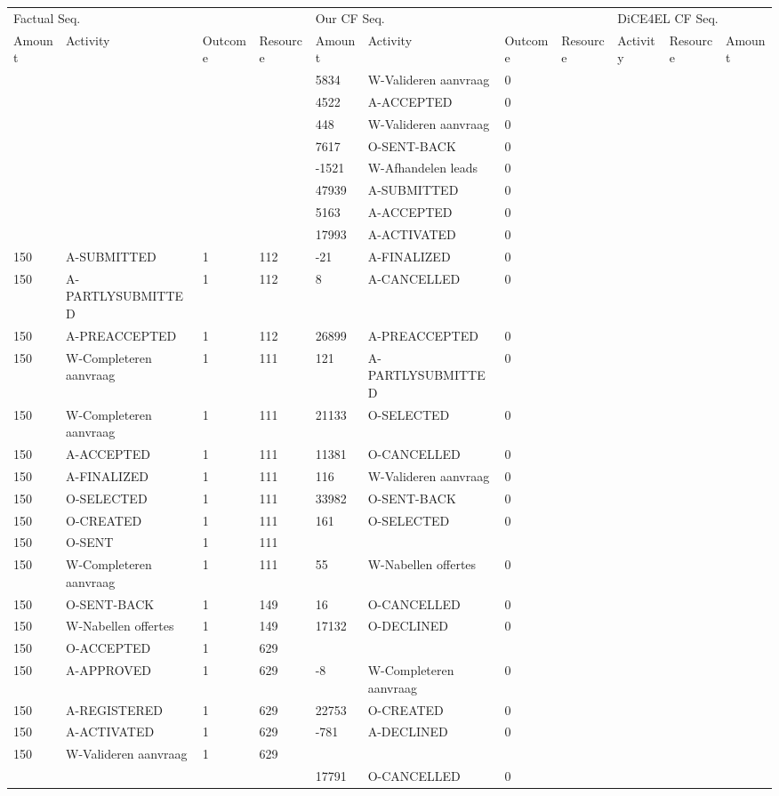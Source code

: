 \begin{tabular}{lllllllllll}
\toprule
\multicolumn{4}{l}{Factual Seq.} & \multicolumn{4}{l}{Our CF Seq.} & \multicolumn{3}{l}{DiCE4EL CF Seq.} \\
Amount & Activity & Outcome & Resource & Amount & Activity & Outcome & Resource & Activity & Resource & Amount \\
\midrule
 &  &  &  & 5834 & W-Valideren aanvraag & 0 &  &  &  &  \\
 &  &  &  & 4522 & A-ACCEPTED & 0 &  &  &  &  \\
 &  &  &  & 448 & W-Valideren aanvraag & 0 &  &  &  &  \\
 &  &  &  & 7617 & O-SENT-BACK & 0 &  &  &  &  \\
 &  &  &  & -1521 & W-Afhandelen leads & 0 &  &  &  &  \\
 &  &  &  & 47939 & A-SUBMITTED & 0 &  &  &  &  \\
 &  &  &  & 5163 & A-ACCEPTED & 0 &  &  &  &  \\
 &  &  &  & 17993 & A-ACTIVATED & 0 &  &  &  &  \\
150 & A-SUBMITTED & 1 & 112 & -21 & A-FINALIZED & 0 &  &  &  &  \\
150 & A-PARTLYSUBMITTED & 1 & 112 & 8 & A-CANCELLED & 0 &  &  &  &  \\
150 & A-PREACCEPTED & 1 & 112 & 26899 & A-PREACCEPTED & 0 &  &  &  &  \\
150 & W-Completeren aanvraag & 1 & 111 & 121 & A-PARTLYSUBMITTED & 0 &  &  &  &  \\
150 & W-Completeren aanvraag & 1 & 111 & 21133 & O-SELECTED & 0 &  &  &  &  \\
150 & A-ACCEPTED & 1 & 111 & 11381 & O-CANCELLED & 0 &  &  &  &  \\
150 & A-FINALIZED & 1 & 111 & 116 & W-Valideren aanvraag & 0 &  &  &  &  \\
150 & O-SELECTED & 1 & 111 & 33982 & O-SENT-BACK & 0 &  &  &  &  \\
150 & O-CREATED & 1 & 111 & 161 & O-SELECTED & 0 &  &  &  &  \\
150 & O-SENT & 1 & 111 &  &  &  &  &  &  &  \\
150 & W-Completeren aanvraag & 1 & 111 & 55 & W-Nabellen offertes & 0 &  &  &  &  \\
150 & O-SENT-BACK & 1 & 149 & 16 & O-CANCELLED & 0 &  &  &  &  \\
150 & W-Nabellen offertes & 1 & 149 & 17132 & O-DECLINED & 0 &  &  &  &  \\
150 & O-ACCEPTED & 1 & 629 &  &  &  &  &  &  &  \\
150 & A-APPROVED & 1 & 629 & -8 & W-Completeren aanvraag & 0 &  &  &  &  \\
150 & A-REGISTERED & 1 & 629 & 22753 & O-CREATED & 0 &  &  &  &  \\
150 & A-ACTIVATED & 1 & 629 & -781 & A-DECLINED & 0 &  &  &  &  \\
150 & W-Valideren aanvraag & 1 & 629 &  &  &  &  &  &  &  \\
 &  &  &  & 17791 & O-CANCELLED & 0 &  &  &  &  \\
\bottomrule
\end{tabular}
